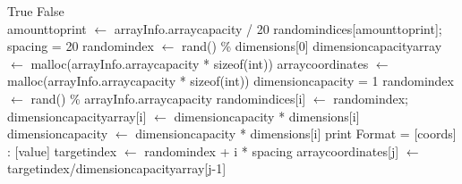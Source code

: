 \documentclass[10pt,twocolumn]{witseiepaper}
\begin{document}
\begin{appendix}
			


\begin{algorithm}[htbp]
	\begin{algorithmic}
		\State \Return True
		\EndIf
		\State \Return False
		\EndFor
		\EndFunction \\
		
		\State amount\textunderscore to\textunderscore print $\leftarrow$ arrayInfo.array\textunderscore capacity / 20
		\State random\textunderscore indices[amount\textunderscore to\textunderscore print];
		\State spacing = 20
		\State random\textunderscore index $\leftarrow$ rand() \% dimensions[0]
		\State dimension\textunderscore capacity\textunderscore array $\leftarrow$ malloc(arrayInfo.array\textunderscore capacity * sizeof(int))
		\State array\textunderscore coordinates $\leftarrow$ malloc(arrayInfo.array\textunderscore capacity * sizeof(int))
		\State dimension\textunderscore capacity = 1
		\State random\textunderscore index $\leftarrow$ rand() \% arrayInfo.array\textunderscore capacity
		\State random\textunderscore indices[i] $\leftarrow$ random\textunderscore index;
		\EndWhile
		\EndFor
		\State dimension\textunderscore capacity\textunderscore array[i] $\leftarrow$ dimension\textunderscore capacity *  dimensions[i]
		\State dimension\textunderscore capacity $\leftarrow$ dimension\textunderscore capacity * dimensions[i]
		\EndFor
		\EndFunction
		\State print Format = [coords] : [value]
		\State target\textunderscore index $\leftarrow$ random\textunderscore index + i * spacing
		\State array\textunderscore coordinates[j] $\leftarrow$ target\textunderscore index/dimension\textunderscore capacity\textunderscore array[j-1]

\end{algorithmic}
\end{algorithm}
\end{appendix}
\end{document}
